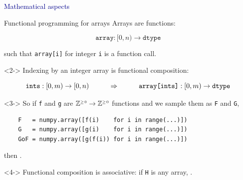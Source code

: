 \documentclass[aspectratio=169]{beamer}
\begin{document}
\begin{frame}{}
\huge
\vspace{1 cm}
\begin{center}
\textcolor{darkblue}{Mathematical aspects}
\end{center}
\end{frame}

\begin{frame}[fragile]{Functional programming for arrays}
\large
\vspace{0.4 cm}
Arrays are functions:

\vspace{-0.45 cm}
\[ \texttt{array}: [0, n) \to \texttt{dtype} \]

\vspace{0.15 cm}
such that \texttt{array[i]} for integer \texttt{i} is a function call.

\vspace{0.5 cm}
\begin{uncoverenv}<2->
Indexing by an integer array is functional composition:

\vspace{-0.5 cm}
\[ \texttt{ints}: [0, m) \to [0, n) \hspace{1 cm}\Rightarrow\hspace{1 cm} \texttt{array[ints]}: [0, m) \to \texttt{dtype} \]
\end{uncoverenv}

\vspace{-0.35 cm}
\begin{uncoverenv}<3->
So if \texttt{f} and \texttt{g} are $\mathbb{Z}^{\mbox{\tiny $\ge\hspace{-0.05 cm}0$}} \to \mathbb{Z}^{\mbox{\tiny $\ge\hspace{-0.05 cm}0$}}$ functions and we sample them as \texttt{F} and \texttt{G},
\normalsize
\begin{verbatim}
    F   = numpy.array([f(i)    for i in range(...)])
    G   = numpy.array([g(i)    for i in range(...)])
    GoF = numpy.array([g(f(i)) for i in range(...)])
\end{verbatim}

\large
\vspace{0.1 cm}
then .
\end{uncoverenv}

\vspace{0.5 cm}
\begin{uncoverenv}<4->
Functional composition is associative: if \texttt{H} is any array, .
\end{uncoverenv}
\end{frame}
\end{document}
